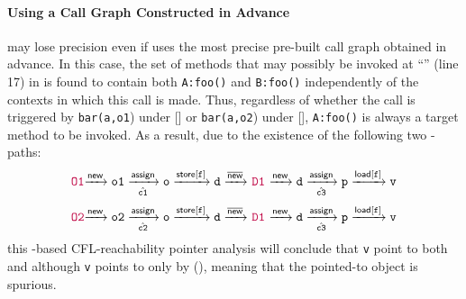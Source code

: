 \paragraph{\bf Using a Call Graph Constructed in Advance} 
\label{sec:manuLFC+pre}
 may lose precision even if \manuLFC uses the most precise pre-built call graph obtained in advance.
In this case, the  set of methods that may possibly be invoked at ``'' (line 17) in  is found to contain both
\texttt{A:foo()} and \texttt{B:foo()} independently of the contexts in which this call
is made. Thus, regardless of whether the call is triggered by
\texttt{bar(a,o1}) under  [] or
\texttt{bar(a,o2}) under  [], \texttt{A:foo()} is always a target method
to be invoked. As a result,
due to the existence of the  following two  \manuLFC-paths:
\begin{equation}
  \centering
\begin{tabular}{l} 
\commentfont{O1}$\xrightarrow{\new}
\texttt{o1}\xrightarrow[\hat{\mathtt{c1}}]{\assign}
\texttt{o} \xrightarrow{\store[\mathtt{f}]} \texttt{d}
\xrightarrow{\inew}$ \commentfont{D1} 
$ \xrightarrow{\new} \texttt{d}
    \xrightarrow[\hat{\mathtt{c3}}]{\assign} \texttt{p}
    \xrightarrow{\load[\texttt{f}]} \texttt{v}
$
\end{tabular} \label{eq:LFCPathCGPreciseI} 
\end{equation}
\begin{equation}
\centering
\begin{tabular}{l} 
\commentfont{O2}$\xrightarrow{\new}
\texttt{o2}\xrightarrow[\hat{\mathtt{c2}}]{\assign}
\texttt{o} \xrightarrow{\store[\mathtt{f}]} \texttt{d}
\xrightarrow{\inew}$ \commentfont{D1} 
$ \xrightarrow{\new} \texttt{d}
    \xrightarrow[\hat{\mathtt{c3}}]{\assign} \texttt{p}
    \xrightarrow{\load[\mathtt{f}]} \texttt{v}
$
\end{tabular} \label{eq:LFCPathCGPreciseII}
  \end{equation}
this \manuLFC-based CFL-reachability pointer analysis will conclude that
 \texttt{v}  point to both  and  although
\texttt{v}  points to  only by  (), meaning that the pointed-to object  is spurious. 


